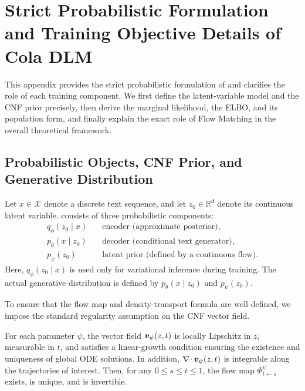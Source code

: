 \section{Strict Probabilistic Formulation and Training Objective Details of Cola DLM}
\label{app:prob_model}

This appendix provides the strict probabilistic formulation of \method and clarifies the role of each training component. We first define the latent-variable model and the CNF prior precisely, then derive the marginal likelihood, the ELBO, and its population form, and finally explain the exact role of Flow Matching in the overall theoretical framework.

\subsection{Probabilistic Objects, CNF Prior, and Generative Distribution}
\label{app:prob_objects}

Let $x\in\mathcal X$ denote a discrete text sequence, and let $z_0\in\mathbb R^d$ denote its continuous latent variable. \method consists of three probabilistic components:
\begin{align}
q_{\phi}(z_0\mid x) &\quad \text{encoder (approximate posterior)}, \\
p_{\theta}(x\mid z_0) &\quad \text{decoder (conditional text generator)}, \\
p_{\psi}(z_0) &\quad \text{latent prior (defined by a continuous flow)}.
\end{align}
Here, $q_{\phi}(z_0\mid x)$ is used only for variational inference during training. The actual generative distribution is defined by $p_{\theta}(x\mid z_0)$ and $p_{\psi}(z_0)$.

To ensure that the flow map and density-transport formula are well defined, we impose the standard regularity assumption on the CNF vector field.

\begin{assumption}
\label{ass:app_cnf_regular}
For each parameter $\psi$, the vector field $\bm{v}_{\psi}(z,t)$ is locally Lipschitz in $z$, measurable in $t$, and satisfies a linear-growth condition ensuring the existence and uniqueness of global ODE solutions. In addition, $\nabla\!\cdot\bm{v}_{\psi}(z,t)$ is integrable along the trajectories of interest. Then, for any $0\le s\le t\le 1$, the flow map $\Phi^{\psi}_{t\leftarrow s}$ exists, is unique, and is invertible.
\end{assumption}

